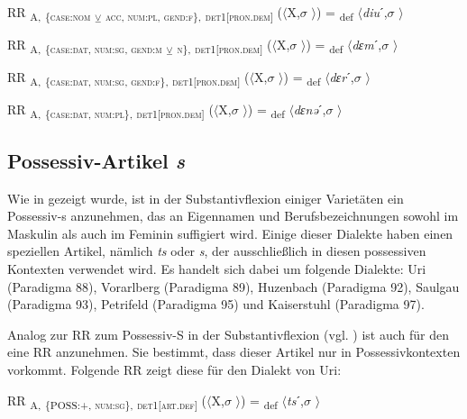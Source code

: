 \ea%
\label{ex:key:133}
 RR \textsubscript{A,} \textsubscript{\{\textsc{case:nom}} \textsubscript{\tiny $\veebar$}\textsubscript{ \textsc{acc}}\textsubscript{, \textsc{num:pl}, \textsc{gend:f}\},} \textsubscript{\textsc{det1[pron.dem]}} ($\langle$X,$\sigma$ $\rangle$) = \textsubscript{def} $\langle$\textit{diu}ˊ,$\sigma$ $\rangle$
\z

\ea%
\label{ex:key:134}
 RR \textsubscript{A,} \textsubscript{\{\textsc{case:dat}, \textsc{num:sg}, \textsc{gend:m}} \textsubscript{\tiny $\veebar$}\textsubscript{ \textsc{n}\},} \textsubscript{\textsc{det1[pron.dem]}} ($\langle$X,$\sigma$ $\rangle$) = \textsubscript{def} $\langle$\textit{dɛm}ˊ,$\sigma$ $\rangle$
\z

\ea%
\label{ex:key:135}
 RR \textsubscript{A,} \textsubscript{\{\textsc{case:dat}, \textsc{num:sg}, \textsc{gend:f}\},} \textsubscript{\textsc{det1[pron.dem]}} ($\langle$X,$\sigma$ $\rangle$) = \textsubscript{def} $\langle$\textit{dɛr}ˊ,$\sigma$ $\rangle$
\z

\ea%
\label{ex:key:136}
 RR \textsubscript{A,} \textsubscript{\{\textsc{case:dat}, \textsc{num:pl}\},} \textsubscript{\textsc{det1[pron.dem]}} ($\langle$X,$\sigma$ $\rangle$) = \textsubscript{def} $\langle$\textit{dɛnə}ˊ,$\sigma$ $\rangle$
\z

\subsection{Possessiv-Artikel \textit{s}}\label{5.5.2}

Wie in  gezeigt wurde, ist in der Substantivflexion einiger Varietäten ein Possessiv-s anzunehmen, das an Eigennamen und Berufsbezeichnungen sowohl im Maskulin als auch im Feminin suffigiert wird. Einige dieser Dialekte haben einen speziellen Artikel, nämlich \textit{ts} oder \textit{s}, der ausschließlich in diesen possessiven Kontexten verwendet wird. Es handelt sich dabei um folgende Dialekte: Uri (Paradigma 88), Vorarlberg (Paradigma 89), Huzenbach (Paradigma 92), Saulgau (Paradigma 93), Petrifeld (Paradigma 95) und Kaiserstuhl (Paradigma 97).

Analog zur RR  zum Possessiv-S in der Substantivflexion (vgl. ) ist auch für den  eine RR anzunehmen. Sie bestimmt, dass dieser Artikel nur in Possessivkontexten vorkommt. Folgende RR zeigt diese für den Dialekt von Uri:

\ea%
\label{ex:key:137}
 RR \textsubscript{A,} \textsubscript{\{POSS:+, \textsc{num:sg}\},} \textsubscript{\textsc{det1[art.def]}} ($\langle$X,$\sigma$ $\rangle$) = \textsubscript{def} $\langle$\textit{ts}ˊ,$\sigma$ $\rangle$ \\
\z

